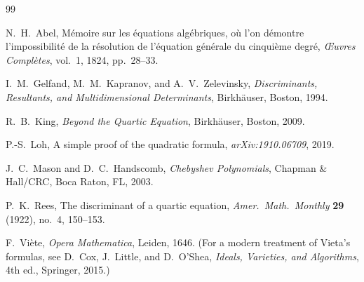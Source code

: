 \documentclass[12pt]{article}
\theoremstyle{definition}
\theoremstyle{remark}
\begin{document}
\begin{thebibliography}{99}

N.~H.~Abel,
M\'emoire sur les \'equations alg\'ebriques, o\`u l'on d\'emontre
l'impossibilit\'e de la r\'esolution de l'\'equation g\'en\'erale du
cinqui\`eme degr\'e,
\emph{{\OE}uvres Compl\`etes}, vol.~1, 1824, pp.~28--33.

I.~M.~Gelfand, M.~M.~Kapranov, and A.~V.~Zelevinsky,
\emph{Discriminants, Resultants, and Multidimensional Determinants},
Birkh\"auser, Boston, 1994.

R.~B.~King,
\emph{Beyond the Quartic Equation},
Birkh\"auser, Boston, 2009.

P.-S.~Loh,
A simple proof of the quadratic formula,
\emph{arXiv:1910.06709}, 2019.

J.~C.~Mason and D.~C.~Handscomb,
\emph{Chebyshev Polynomials},
Chapman \& Hall/CRC, Boca Raton, FL, 2003.

P.~K.~Rees,
The discriminant of a quartic equation,
\emph{Amer.\ Math.\ Monthly} \textbf{29} (1922), no.~4, 150--153.

F.~Vi\`ete,
\emph{Opera Mathematica},
Leiden, 1646.
(For a modern treatment of Vieta's formulas, see D.~Cox, J.~Little, and D.~O'Shea,
\emph{Ideals, Varieties, and Algorithms}, 4th ed., Springer, 2015.)

\end{thebibliography}
\end{document}
